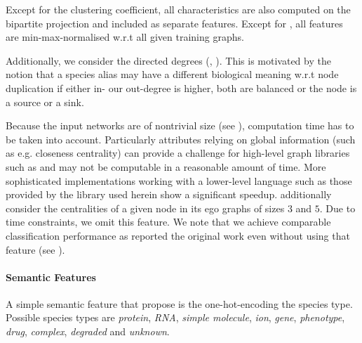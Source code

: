 \documentclass[
	fontsize=10pt, %
	twoside=false, %
	secnumdepth=1, %
  toc=indentunnumbered %
]{kaobook}
\begin{document}
Except for the clustering coefficient, all characteristics are also
computed on the bipartite projection and included as separate features.
Except for , all features are min-max-normalised
w.r.t all given training graphs.


Additionally, we consider the directed degrees (,
). This is motivated by the notion that a species alias may
have a different biological meaning w.r.t node duplication if either in- our
out-degree is higher, both are balanced or the node is a source or a sink.

Because the input networks are of nontrivial size (see ),
computation time has to be taken into account.
% 
Particularly attributes relying on global information (such as e.g. closeness
centrality) can provide a challenge for high-level graph libraries such as
 and may not be computable in a reasonable amount of time. More
sophisticated implementations working with a lower-level language such as those
provided by the  library used herein show a significant speedup.
\citeauthor{nielsen_MachineLearningSupport_2019} additionally consider the
centralities of a given node in its ego graphs of sizes $3$ and $5$. Due to time
constraints, we omit this feature. We note that we achieve comparable
classification performance as reported the original work even without using that
feature (see ).



\paragraph{Semantic Features}

A simple semantic feature that \citeauthor{nielsen_MachineLearningSupport_2019}
propose is the one-hot-encoding the species type.
Possible species types are
\textit{protein}, \textit{RNA}, \textit{simple molecule}, \textit{ion},
\textit{gene}, \textit{phenotype}, \textit{drug}, \textit{complex},
\textit{degraded} and \textit{unknown}. 
\end{document}
